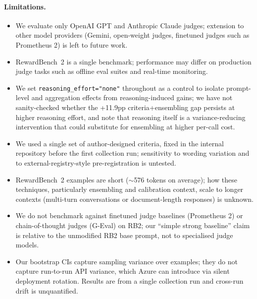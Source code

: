\documentclass{article}
\begin{document}
\paragraph{Limitations.}
\begin{itemize}
  \item We evaluate only OpenAI GPT and Anthropic Claude judges; extension to other model providers (Gemini, open-weight judges, finetuned judges such as Prometheus 2) is left to future work.
  \item RewardBench~2 is a single benchmark; performance may differ on production judge tasks such as offline eval suites and real-time monitoring.
  \item We set \texttt{reasoning\_effort="none"} throughout as a control to isolate prompt-level and aggregation effects from reasoning-induced gains; we have not sanity-checked whether the +11.9pp criteria+ensembling gap persists at higher reasoning effort, and note that reasoning itself is a variance-reducing intervention that could substitute for ensembling at higher per-call cost.
  \item We used a single set of author-designed criteria, fixed in the internal repository before the first collection run; sensitivity to wording variation and to external-registry-style pre-registration is untested.
  \item RewardBench~2 examples are short (${\sim}$576 tokens on average); how these techniques, particularly ensembling and calibration context, scale to longer contexts (multi-turn conversations or document-length responses) is unknown.
  \item We do not benchmark against finetuned judge baselines (Prometheus 2) or chain-of-thought judges (G-Eval) on RB2; our ``simple strong baseline'' claim is relative to the unmodified RB2 base prompt, not to specialised judge models.
  \item Our bootstrap CIs capture sampling variance over examples; they do not capture run-to-run API variance, which Azure can introduce via silent deployment rotation. Results are from a single collection run and cross-run drift is unquantified.
\end{itemize}
\end{document}
